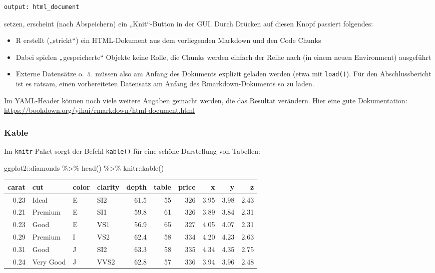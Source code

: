 \documentclass[11pt,german,a4paper]{article}
\newenvironment{Shaded}{\begin{snugshade}}{\end{snugshade}}
\newcommand{\FunctionTok}[1]{\textcolor[rgb]{0.00,0.00,0.00}{#1}}
\newcommand{\NormalTok}[1]{#1}
\newcommand{\SpecialCharTok}[1]{\textcolor[rgb]{0.00,0.00,0.00}{#1}}
\providecommand{\tightlist}{%
  \setlength{\itemsep}{0pt}\setlength{\parskip}{0pt}}
\begin{document}
\begin{verbatim}
output: html_document
\end{verbatim}

setzen, erscheint (nach Abspeichern) ein „Knit``-Button in der GUI. Durch Drücken auf diesen Knopf passiert folgendes:

\begin{itemize}
\tightlist
\item
  R erstellt („strickt``) ein HTML-Dokument aus dem vorliegenden Markdown und den Code Chunks
\item
  Dabei spielen „gespeicherte`` Objekte keine Rolle, die Chunks werden einfach der Reihe nach (in einem neuen Environment) ausgeführt
\item
  Externe Datensätze o.~ä. müssen also am Anfang des Dokuments explizit geladen werden (etwa mit \texttt{load()}). Für den Abschlussbericht ist es ratsam, einen vorbereiteten Datensatz am Anfang des Rmarkdown-Dokuments so zu laden.
\end{itemize}

Im YAML-Header können noch viele weitere Angaben gemacht werden, die das Resultat verändern. Hier eine gute Dokumentation: \url{https://bookdown.org/yihui/rmarkdown/html-document.html}

\hypertarget{kable}{%
\subsubsection{Kable}\label{kable}}

Im \texttt{knitr}-Paket sorgt der Befehl \texttt{kable()} für eine schöne Darstellung von Tabellen:

\begin{Shaded}
\begin{Highlighting}[]
\NormalTok{ggplot2}\SpecialCharTok{::}\NormalTok{diamonds }\SpecialCharTok{\%\textgreater{}\%}
  \FunctionTok{head}\NormalTok{() }\SpecialCharTok{\%\textgreater{}\%}
\NormalTok{  knitr}\SpecialCharTok{::}\FunctionTok{kable}\NormalTok{()}
\end{Highlighting}
\end{Shaded}

\begin{tabular}{r|l|l|l|r|r|r|r|r|r}
\hline
carat & cut & color & clarity & depth & table & price & x & y & z\\
\hline
0.23 & Ideal & E & SI2 & 61.5 & 55 & 326 & 3.95 & 3.98 & 2.43\\
\hline
0.21 & Premium & E & SI1 & 59.8 & 61 & 326 & 3.89 & 3.84 & 2.31\\
\hline
0.23 & Good & E & VS1 & 56.9 & 65 & 327 & 4.05 & 4.07 & 2.31\\
\hline
0.29 & Premium & I & VS2 & 62.4 & 58 & 334 & 4.20 & 4.23 & 2.63\\
\hline
0.31 & Good & J & SI2 & 63.3 & 58 & 335 & 4.34 & 4.35 & 2.75\\
\hline
0.24 & Very Good & J & VVS2 & 62.8 & 57 & 336 & 3.94 & 3.96 & 2.48\\
\hline
\end{tabular}
\end{document}
